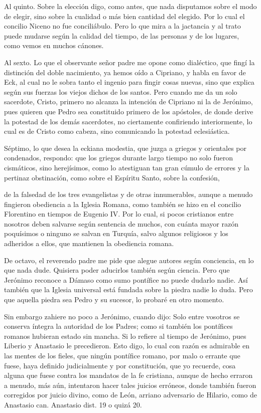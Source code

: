 Al quinto. Sobre la elección digo, como antes, que nada disputamos sobre el modo de elegir, sino sobre la cualidad o más bien cantidad del elegido. Por lo cual el concilio Niceno no fue conciliábulo. Pero lo que mira a la jactancia y al trato puede mudarse según la calidad del tiempo, de las personas y de los lugares, como vemos en muchos cánones.

Al sexto. Lo que el observante señor padre me opone como dialéctico, que fingí la distinción del doble nacimiento, ya hemos oído a Cipriano, y habla en favor de Eck, al cual no le sobra tanto el ingenio para fingir cosas nuevas, sino que explica según sus fuerzas los viejos dichos de los santos. Pero cuando me da un solo sacerdote, Cristo, primero no alcanza la intención de Cipriano ni la de Jerónimo, pues quieren que Pedro sea constituido primero de los apóstoles, de donde derive la potestad de los demás sacerdotes, no ciertamente confiriendo interiormente, lo cual es de Cristo como cabeza, sino comunicando la potestad eclesiástica.

Séptimo, lo que desea la eckiana modestia, que juzga a griegos y orientales por condenados, respondo: que los griegos durante largo tiempo no solo fueron cismáticos, sino herejísimos, como lo atestiguan tan gran cúmulo de errores y la pertinaz obstinación, como sobre el Espíritu Santo, sobre la confesión,

de la falsedad de los tres evangelistas y de otras innumerables, aunque a menudo fingieron obediencia a la Iglesia Romana, como también se hizo en el concilio Florentino en tiempos de Eugenio IV. Por lo cual, si pocos cristianos entre nosotros deben salvarse según sentencia de muchos, con cuánta mayor razón poquísimos o ninguno se salvan en Turquía, salvo algunos religiosos y los adheridos a ellos, que mantienen la obediencia romana.

De octavo, el reverendo padre me pide que alegue autores según conciencia, en lo que nada dude. Quisiera poder aducirlos también \marginpar{\small[270]} según ciencia. Pero que Jerónimo reconoce a Dámaso como sumo pontífice no puede dudarlo nadie. Así también que la Iglesia universal está fundada sobre la piedra nadie lo duda. Pero que aquella piedra sea Pedro y su sucesor, lo probaré en otro momento.

Sin embargo zahiere no poco a Jerónimo, cuando dijo: Solo entre vosotros se conserva íntegra la autoridad de los Padres; como si también los pontífices romanos hubieran estado sin mancha. Si lo refiere al tiempo de Jerónimo, pues Liberio y Anastasio le precedieron. Esto digo, lo cual con razón es admirable en las mentes de los fieles, que ningún pontífice romano, por malo o errante que fuese, haya definido judicialmente y por constitución, que yo recuerde, cosa alguna que fuese contra los mandatos de la fe cristiana, aunque de hecho erraron a menudo, más aún, intentaron hacer tales juicios erróneos, donde también fueron corregidos por juicio divino, como de León, arriano adversario de Hilario, como de Anastasio can. Anastasio dist. 19 o quizá 20.

